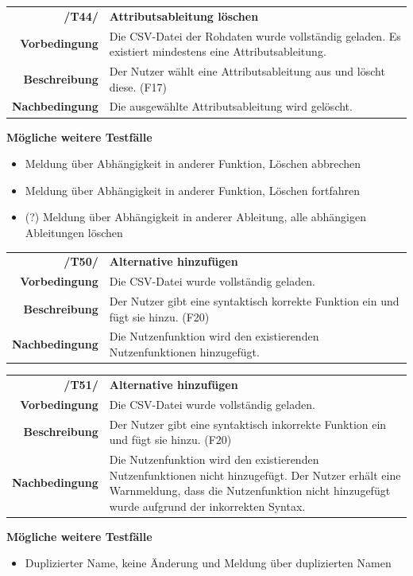 \documentclass{article}
\begin{document}
\begin{table}[H]
\begin{tabularx}{\textwidth}{rX}
\textbf{/T44/}         & \textbf{Attributsableitung löschen} \\
\textbf{Vorbedingung}  & Die CSV-Datei der Rohdaten wurde vollständig geladen. Es existiert mindestens eine Attributsableitung.  \\
\textbf{Beschreibung}  & Der Nutzer wählt eine Attributsableitung aus und löscht diese. (F17) \\
\textbf{Nachbedingung} & Die ausgewählte Attributsableitung wird gelöscht.
\end{tabularx}
\end{table}
\textbf{Mögliche weitere Testfälle}
\begin{itemize}
    \item Meldung über Abhängigkeit in anderer Funktion, Löschen abbrechen
    \item Meldung über Abhängigkeit in anderer Funktion, Löschen fortfahren
    \item (?) Meldung über Abhängigkeit in anderer Ableitung, alle abhängigen Ableitungen löschen
\end{itemize}

\begin{table}[H]
\begin{tabularx}{\textwidth}{rX}
\textbf{/T50/}         & \textbf{Alternative hinzufügen} \\
\textbf{Vorbedingung}  & Die CSV-Datei wurde vollständig geladen.   \\
\textbf{Beschreibung}  & Der Nutzer gibt eine syntaktisch korrekte Funktion ein und fügt sie hinzu. (F20) \\
\textbf{Nachbedingung} & Die Nutzenfunktion wird den existierenden Nutzenfunktionen hinzugefügt.
\end{tabularx}
\end{table}

\begin{table}[H]
\begin{tabularx}{\textwidth}{rX}
\textbf{/T51/}         & \textbf{Alternative hinzufügen} \\
\textbf{Vorbedingung}  & Die CSV-Datei wurde vollständig geladen.   \\
\textbf{Beschreibung}  & Der Nutzer gibt eine syntaktisch inkorrekte Funktion ein und fügt sie hinzu. (F20) \\
\textbf{Nachbedingung} & Die Nutzenfunktion wird den existierenden Nutzenfunktionen nicht hinzugefügt. Der Nutzer erhält eine Warnmeldung, dass die Nutzenfunktion nicht hinzugefügt wurde aufgrund der inkorrekten Syntax.
\end{tabularx}
\end{table}
\textbf{Mögliche weitere Testfälle}
\begin{itemize}
    \item Duplizierter Name, keine Änderung und Meldung über duplizierten Namen
\end{itemize}
\end{document}
